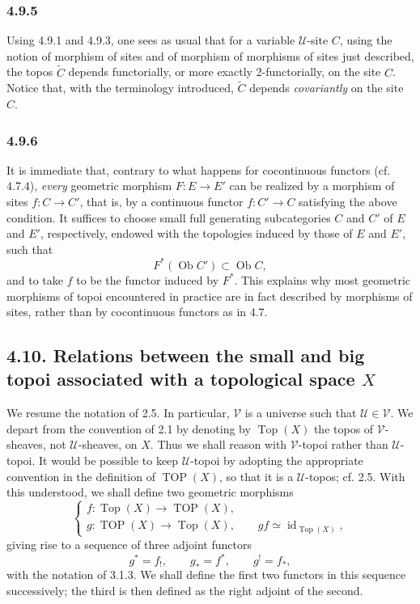 \documentclass[11pt]{article}
\newcommand{\U}{\mathcal{U}}
\newcommand{\V}{\mathcal{V}}
\newcommand{\Top}{\operatorname{Top}}
\newcommand{\TOP}{\operatorname{TOP}}
\newcommand{\Ob}{\operatorname{Ob}}
\newcommand{\id}{\operatorname{id}}
\begin{document}
\subsubsection*{4.9.5}
Using 4.9.1 and 4.9.3, one sees as usual that for a variable \(\U\)-site \(C\), using the notion of morphism of sites and of morphism of morphisms of sites just described, the topos \(\widetilde C\) depends functorially, or more exactly 2-functorially, on the site \(C\). Notice that, with the terminology introduced, \(\widetilde C\) depends \emph{covariantly} on the site \(C\).

\subsubsection*{4.9.6}
It is immediate that, contrary to what happens for cocontinuous functors (cf. 4.7.4), \emph{every} geometric morphism \(F:E\to E'\) can be realized by a morphism of sites \(f:C\to C'\), that is, by a continuous functor \(f:C'\to C\) satisfying the above condition. It suffices to choose small full generating subcategories \(C\) and \(C'\) of \(E\) and \(E'\), respectively, endowed with the topologies induced by those of \(E\) and \(E'\), such that
\[
F^\ast(\Ob C')\subset\Ob C,
\]
and to take \(f\) to be the functor induced by \(F^\ast\). This explains why most geometric morphisms of topoi encountered in practice are in fact described by morphisms of sites, rather than by cocontinuous functors as in 4.7.

\subsection*{4.10. Relations between the small and big topoi associated with a topological space \(X\)}
We resume the notation of 2.5. In particular, \(\V\) is a universe such that \(\U\in\V\). We depart from the convention of 2.1 by denoting by \(\Top(X)\) the topos of \(\V\)-sheaves, not \(\U\)-sheaves, on \(X\). Thus we shall reason with \(\V\)-topoi rather than \(\U\)-topoi. It would be possible to keep \(\U\)-topoi by adopting the appropriate convention in the definition of \(\TOP(X)\), so that it is a \(\U\)-topos; cf. 2.5. With this understood, we shall define two geometric morphisms
\[
\begin{cases}
 f:\Top(X)\longrightarrow\TOP(X),\\
 g:\TOP(X)\longrightarrow\Top(X),\qquad gf\simeq\id_{\Top(X)},
\end{cases}\tag{4.10.1}
\]
giving rise to a sequence of three adjoint functors
\[
g^\ast=f_!,\qquad g_\ast=f^\ast,
\qquad g^!=f_\ast,\tag{4.10.1.1}
\]
with the notation of 3.1.3. We shall define the first two functors in this sequence successively; the third is then defined as the right adjoint of the second.
\end{document}
